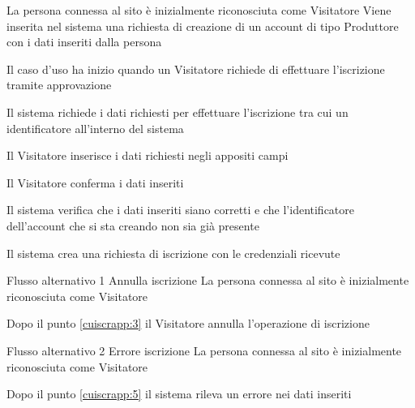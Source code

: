 
{}
{La persona connessa al sito è inizialmente riconosciuta come Visitatore}
{Viene inserita nel sistema una richiesta di creazione di un account di tipo Produttore con i dati inseriti dalla persona}
{\begin{enumCU}
	\item Il caso d'uso ha inizio quando un Visitatore richiede di effettuare l'iscrizione tramite approvazione
	\item Il sistema richiede i dati richiesti per effettuare l'iscrizione  tra cui un identificatore all'interno del sistema
	\item Il Visitatore inserisce i dati richiesti negli appositi campi \label{cuiscrapp:3}
	\item Il Visitatore conferma i dati inseriti
	\item Il sistema verifica che i dati inseriti siano corretti e che l'identificatore dell'account che si sta creando non sia già presente \label{cuiscrapp:5}
	\item Il sistema crea una richiesta di iscrizione con le credenziali ricevute
\end{enumCU}}
%
{Flusso alternativo 1}%
{Annulla iscrizione}%
{La persona connessa al sito è inizialmente riconosciuta come Visitatore}%
{\postNulle}%
{\begin{enumCU}
		\item Dopo il punto \ref{cuiscrapp:3} il Visitatore annulla l'operazione di iscrizione
	\end{enumCU}}%
%
{Flusso alternativo 2}%
{Errore iscrizione}%
{La persona connessa al sito è inizialmente riconosciuta come Visitatore}%
{\postNulle}%
{\begin{enumCU}
		\item Dopo il punto \ref{cuiscrapp:5} il sistema rileva un errore nei dati inseriti
	\end{enumCU}}%


